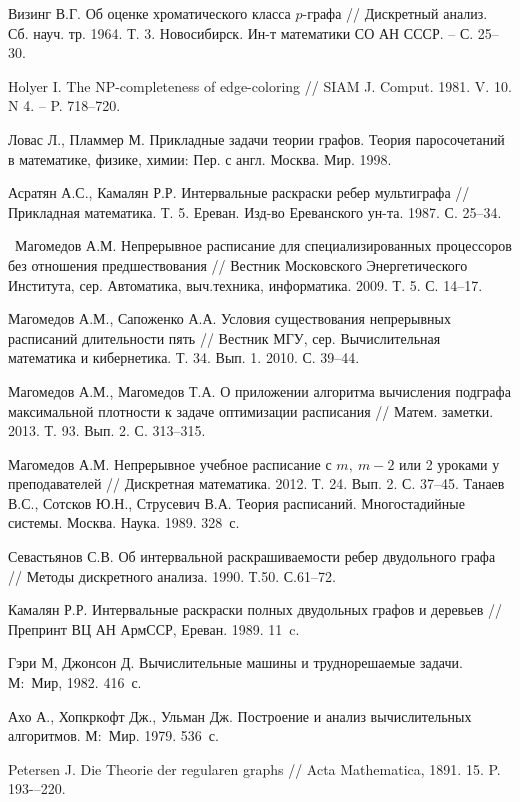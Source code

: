 \begin{thebibliography}{1}
Визинг В.Г. Об оценке хроматического класса $p$-графа //
Дискретный анализ. Сб. науч. тр. 1964. Т. 3. Новосибирск. Ин-т математики СО АН СССР. -- С. 25--30.

 Holyer I. The NP-completeness of edge-coloring //
 SIAM J. Comput. 1981. V. 10. N 4. -- P. 718--720.

Ловас Л., Пламмер М. Прикладные задачи теории графов. Теория паросочетаний в математике, физике, химии: Пер. с англ. Москва. Мир. 1998.

Асратян А.С., Камалян Р.Р. Интервальные раскраски ребер мультиграфа // Прикладная математика. Т. 5. Ереван.  Изд-во Ереванского ун-та. 1987.  С. 25--34.

~Магомедов А.М. Непрерывное расписание для специализированных процессоров без отношения предшествования //
Вестник Московского Энергетического Института, сер. Автоматика, выч.техника, информатика. 2009. Т. 5. С. 14--17.

Магомедов А.М., Сапоженко А.А.
Условия существования непрерывных расписаний длительности пять // Вестник МГУ, сер. Вычислительная математика и кибернетика. Т. 34. Вып. 1. 2010. С. 39--44.

Магомедов А.М., Магомедов Т.А. О приложении алгоритма вычисления подграфа максимальной плотности к задаче оптимизации расписания // Матем. заметки. 2013. Т. 93. Вып. 2. С. 313--315.

Магомедов А.М. Непрерывное учебное расписание с $m,\ m-2$ или 2 уроками у преподавателей // Дискретная математика. 2012. Т. 24. Вып. 2. С. 37--45.
Танаев В.С., Сотсков Ю.Н., Струсевич В.А. Теория расписаний. Многостадийные системы. Москва. Наука. 1989. 328~с.

Севастьянов С.В. Об интервальной раскрашиваемости ребер двудольного графа // Методы дискретного анализа. 1990. Т.50. С.61--72.

Камалян Р.Р. Интервальные раскраски полных двудольных графов и деревьев // Препринт ВЦ АН АрмССР, Ереван. 1989. 11~c.

Гэри М, Джонсон Д. Вычислительные машины и труднорешаемые задачи.
М:~Мир, 1982. 416~с.

  Ахо А., Хопкркофт Дж., Ульман Дж. Построение и анализ вычислительных алгоритмов.
М:~Мир. 1979. 536~с.

 Petersen J. Die Theorie der regularen graphs // Acta Mathematica, 1891. 15. P. 193-–220.


\end{thebibliography}
